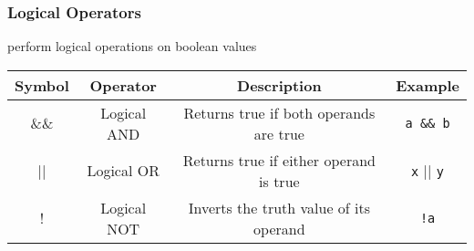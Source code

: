 \documentclass[11pt,A4]{article}
\begin{document}
            \subsubsection{Logical Operators} 
            perform logical operations on boolean values
            \begin{table}[h]
                \centering
                \setlength{\arrayrulewidth}{0.3mm}
                \renewcommand{\arraystretch}{1.2}
                \begin{tabular}{cccc}
                    \toprule
                    Symbol & Operator & Description & Example \\
                    \midrule
                    \&\& & Logical AND & Returns true if both operands are true & \verb|a && b| \\
                    \arrayrulecolor{gray!50}\cmidrule(lr){1-4}\arrayrulecolor{black}
                    || & Logical OR & Returns true if either operand is true & \verb|x| || \verb|y| \\
                    \arrayrulecolor{gray!50}\cmidrule(lr){1-4}\arrayrulecolor{black}
                    ! & Logical NOT & Inverts the truth value of its operand & \verb|!a| \\
                    \bottomrule
                \end{tabular}
            \end{table}  \\ 
            
\end{document}
